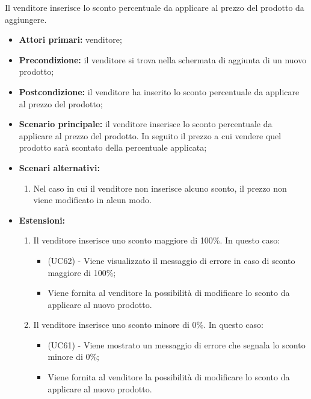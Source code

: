 Il venditore inserisce lo sconto percentuale da applicare al prezzo del prodotto da aggiungere.
\begin{itemize}
    \item \textbf{Attori primari:} venditore;
    \item \textbf{Precondizione:} il venditore si trova nella schermata di aggiunta di un nuovo prodotto;
    \item \textbf{Postcondizione:} il venditore ha inserito lo sconto percentuale da applicare al prezzo del prodotto;
    \item \textbf{Scenario principale:} il venditore inserisce lo sconto percentuale da applicare al prezzo del prodotto. In seguito il prezzo a cui vendere quel prodotto sarà scontato della percentuale applicata;
    \item \textbf{Scenari alternativi:}
    \begin{enumerate}[label=\lett]
    	\item Nel caso in cui il venditore non inserisce alcuno sconto, il prezzo non viene modificato in alcun modo.
    \end{enumerate}
    \item \textbf{Estensioni:}
    \begin{enumerate}[label=\lett]
    	\item Il venditore inserisce uno sconto maggiore di 100\%. In questo caso:
    	\begin{itemize}
    		\item (UC62) - Viene visualizzato il messaggio di errore in caso di sconto maggiore di 100\%;
    		\item Viene fornita al venditore la possibilità di modificare lo sconto da applicare al nuovo prodotto.
    	\end{itemize}
    	\item Il venditore inserisce uno sconto minore di 0\%. In questo caso:
    	\begin{itemize}
    		\item (UC61) - Viene mostrato un messaggio di errore che segnala lo sconto minore di 0\%;
    		\item Viene fornita al venditore la possibilità di modificare lo sconto da applicare al nuovo prodotto.
    	\end{itemize}
    \end{enumerate}
\end{itemize}

